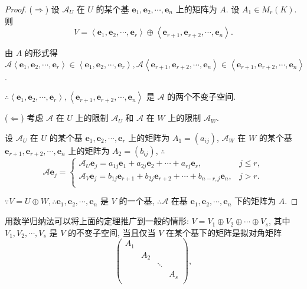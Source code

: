 \documentclass[color=black,device=normal,lang=cn,mode=geye]{elegantnote}
\begin{document}
\begin{proof}
    ($\Rightarrow$) 设 $\mathcal{A}_U$ 在 $U$ 的某个基 $\boldsymbol{e}_1,\boldsymbol{e}_2,\cdots,\boldsymbol{e}_n$ 上的矩阵为 $A$. 设 $A_1\in M_r(K)$. 则
    \[V=\left<\boldsymbol{e}_1,\boldsymbol{e}_2,\cdots,\boldsymbol{e}_r\right>\oplus\left<\boldsymbol{e}_{r+1},\boldsymbol{e}_{r+2},\cdots,\boldsymbol{e}_n\right>.\]

    由 $A$ 的形式得 $\mathcal{A}\left<\boldsymbol{e}_1,\boldsymbol{e}_2,\cdots,\boldsymbol{e}_r\right>\in\left<\boldsymbol{e}_1,\boldsymbol{e}_2,\cdots,\boldsymbol{e}_r\right>,\mathcal{A}\left<\boldsymbol{e}_{r+1},\boldsymbol{e}_{r+2},\cdots,\boldsymbol{e}_n\right>\in\left<\boldsymbol{e}_{r+1},\boldsymbol{e}_{r+2},\cdots,\boldsymbol{e}_n\right>$.
    
    $\therefore\left<\boldsymbol{e}_1,\boldsymbol{e}_2,\cdots,\boldsymbol{e}_r\right>,\left<\boldsymbol{e}_{r+1},\boldsymbol{e}_{r+2},\cdots,\boldsymbol{e}_n\right>$ 是 $\mathcal{A}$ 的两个不变子空间.

    ($\Leftarrow$) 考虑 $\mathcal{A}$ 在 $U$ 上的限制 $\mathcal{A}_U$ 和 $\mathcal{A}$ 在 $W$ 上的限制 $\mathcal{A}_W$.

    设 $\mathcal{A}_U$ 在 $U$ 的某个基 $\boldsymbol{e}_1,\boldsymbol{e}_2,\cdots,\boldsymbol{e}_r$ 上的矩阵为 $A_1=(a_{ij})$, $\mathcal{A}_W$ 在 $W$ 的某个基 $\boldsymbol{e}_{r+1},\boldsymbol{e}_{r+2},\cdots,\boldsymbol{e}_n$ 上的矩阵为 $A_2=(b_{ij})$, $\therefore$
    \[\mathcal{A}\boldsymbol{e}_j=\begin{cases}
        \mathcal{A}_U\boldsymbol{e}_j=a_{1j}\boldsymbol{e}_1+a_{2j}\boldsymbol{e}_2+\cdots+a_{rj}\boldsymbol{e}_r, & j\leq r, \\
        \mathcal{A}_V\boldsymbol{e}_j=b_{1j}\boldsymbol{e}_{r+1}+b_{2j}\boldsymbol{e}_{r+2}+\cdots+b_{n-r,j}\boldsymbol{e}_n, & j>r. \\
    \end{cases}\]
    
    $\because V=U\oplus W,\therefore\boldsymbol{e}_1,\boldsymbol{e}_2,\cdots,\boldsymbol{e}_n$ 是 $V$ 的一个基, $\therefore\mathcal{A}$ 在基 $\boldsymbol{e}_1,\boldsymbol{e}_2,\cdots,\boldsymbol{e}_n$ 下的矩阵为 $A$.
\end{proof}
用数学归纳法可以将上面的定理推广到一般的情形: $V=V_1\oplus V_2\oplus\cdots\oplus V_s$, 其中 $V_1,V_2,\cdots,V_s$ 是 $V$ 的不变子空间, 当且仅当 $V$ 在某个基下的矩阵是拟对角矩阵
\[\begin{pmatrix}
    A_1 \\
    & A_2 \\
    && \ddots \\
    &&& A_s \\
\end{pmatrix},\]
\end{document}
